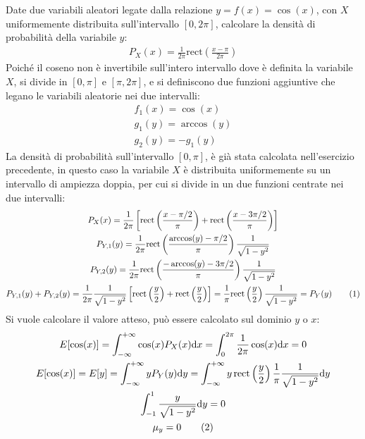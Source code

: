 \documentclass{article}
\newcommand{\rect}{\mathrm{rect}}
\newcommand{\df}{\mathrm{d}}
\newcommand{\tageq}{\tag{\stepcounter{equation}\theequation}}
\begin{document}
Date due variabili aleatori legate dalla relazione $y=f(x)=\cos(x)$, con $X$ uniformemente distribuita sull'intervallo $[0,2\pi]$, calcolare la densità di probabilità 
della variabile $y$:
\begin{gather*}
    P_X(x)=\displaystyle\frac{1}{2\pi}\rect\left(\frac{x-\pi}{2\pi}\right)
\end{gather*}
Poiché il coseno non è invertibile sull'intero intervallo dove è definita la variabile $X$, si divide in $[0,\pi]$ e $[\pi,2\pi]$, e si definiscono due funzioni 
aggiuntive che legano le variabili aleatorie nei due intervalli:
\begin{gather*}
    f_1(x)=\cos(x)\\
    g_1(y)=\arccos(y)\\
    g_2(y)=-g_1(y)
\end{gather*}
La densità di probabilità sull'intervallo $[0,\pi]$, è già stata calcolata nell'esercizio precedente, in questo caso la variabile $X$ è distribuita uniformemente su un 
intervallo di ampiezza doppia, per cui si divide in un due funzioni centrate nei due intervalli:
\begin{gather*}
    P_X(x)=\displaystyle\frac{1}{2\pi}\left[\rect\left(\frac{x-\pi/2}{\pi}\right)+\rect\left(\frac{x-3\pi/2}{\pi}\right)\right]\\
    P_{Y,1}(y)=\displaystyle\frac{1}{2\pi}\rect\left(\frac{\arccos(y)-\pi/2}{\pi}\right)\frac{1}{\sqrt{1-y^2}}\\
    P_{Y,2}(y)=\displaystyle\frac{1}{2\pi}\rect\left(\frac{-\arccos(y)-3\pi/2}{\pi}\right)\frac{1}{\sqrt{1-y^2}}\\
    P_{Y,1}(y)+P_{Y,2}(y)=\displaystyle\frac{1}{2\pi}\frac{1}{\sqrt{1-y^2}}\left[\rect\left(\frac{y}{2}\right)+\rect\left(\frac{y}{2}\right)\right]=\frac{1}{\pi}\rect\left(\displaystyle\frac{y}{2}\right)\frac{1}{\sqrt{1-y^2}}=P_Y(y)\tageq
\end{gather*}
Si vuole calcolare il valore atteso, può essere calcolato sul dominio $y$ o $x$:
\begin{gather*}
    E[\cos (x)]=\displaystyle\int_{-\infty}^{+\infty}\cos (x)P_X(x)\df x =\int_0^{2\pi}\frac{1}{2\pi}\cos(x)\df x=0\\
    E[\cos(x)]=E[y]=\displaystyle\int_{-\infty}^{+\infty}yP_Y(y)\df y=\int_{-\infty}^{+\infty}y\,\rect\left(\frac{y}{2}\right)\frac{1}{\pi}\frac{1}{\sqrt{1-y^2}}\df y\\
    \displaystyle\int_{-1}^1\frac{y}{\sqrt{1-y^2}}\df y=0\\
    \mu_y=0\tageq
\end{gather*}
\end{document}

